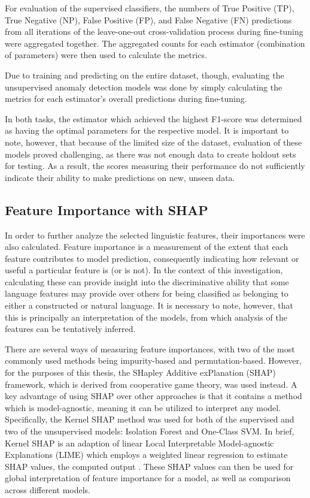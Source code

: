 \documentclass[12pt,a4paper]{article}
\numberwithin{figure}{section}
\numberwithin{table}{section}
\numberwithin{definition}{section}
\begin{document}
For evaluation of the supervised classifiers, the numbers of True Positive (TP), True Negative (NP), False Positive (FP), and False Negative (FN) predictions from all iterations of the leave-one-out cross-validation process during fine-tuning were aggregated together. The aggregated counts for each estimator (combination of parameters) were then used to calculate the metrics. 

Due to training and predicting on the entire dataset, though, evaluating the unsupervised anomaly detection models was done by simply calculating the metrics for each estimator's overall predictions during fine-tuning.

In both tasks, the estimator which achieved the highest F1-score was determined as having the optimal parameters for the respective model. It is important to note, however, that because of the limited size of the dataset, evaluation of these models proved challenging, as there was not enough data to create holdout sets for testing. As a result, the scores measuring their performance do not sufficiently indicate their ability to make predictions on new, unseen data. 

\subsection{Feature Importance with SHAP}
\label{ssec:featureimportances}

In order to further analyze the selected linguistic features, their importances were also calculated. Feature importance is a measurement of the extent that each feature contributes to model prediction, consequently indicating how relevant or useful a particular feature is (or is not). In the context of this investigation, calculating these can provide insight into the discriminative ability that some language features may provide over others for being classified as belonging to either a constructed or natural language. It is necessary to note, however, that this is principally an interpretation of the models, from which analysis of the features can be tentatively inferred.


There are several ways of measuring feature importances, with two of the most commonly used methods being impurity-based and permutation-based. However, for the purposes of this thesis, the SHapley Additive exPlanation (SHAP) framework, which is derived from cooperative game theory, was used instead. A key advantage of using SHAP over other approaches is that it contains a method which is model-agnostic, meaning it can be utilized to interpret any model. Specifically, the Kernel SHAP method was used for both of the supervised and two of the unsupervised models: Isolation Forest and One-Class SVM. In brief, Kernel SHAP is an adaption of linear Local Interpretable Model-agnostic Explanations (LIME) which employs a weighted linear regression to estimate SHAP values, the computed output \parencite{Lundberg2017article}. These SHAP values can then be used for global interpretation of feature importance for a model, as well as comparison across different models.
\end{document}
